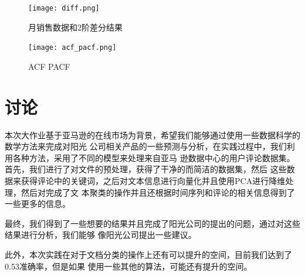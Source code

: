 \begin{figure}
    \centering
    \texttt{[image: diff.png]}
    \caption{月销售数据和2阶差分结果}
    \label{fig:arima_diff}
\end{figure}

\begin{figure}
    \centering
    \texttt{[image: acf\_pacf.png]}
    \caption{ACF PACF}
    \label{fig:arima_para}
\end{figure}


\chapter{讨论}
本次大作业基于亚马逊的在线市场为背景，希望我们能够通过使用一些数据科学的数学方法来完成对阳光
公司相关产品的一些预测与分析，在实践过程中，我们利用各种方法，采用了不同的模型来处理来自亚马
逊数据中心的用户评论数据集。首先，我们进行了对文件的预处理，获得了干净的而简洁的数据集，然后
这些数据来获得评论中的关键词，之后对文本信息进行向量化并且使用PCA进行降维处理，然后对完成了文
本聚类的操作并且还根据时间序列和评论的相关信息得到了一些更多的信息。

最终，我们得到了一些想要的结果并且完成了阳光公司的提出的问题，通过对这些结果进行分析，我们能够
像阳光公司提出一些建议。

此外，本次实践在对于文档分类的操作上还有可以提升的空间，目前我们达到了0.53准确率，但是如果
使用一些其他的算法，可能还有提升的空间。
